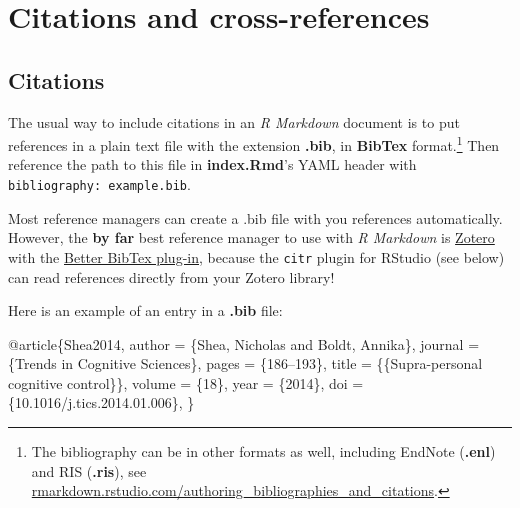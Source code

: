 \documentclass[a4paper, twoside]{templates/ociamthesis}
\newenvironment{Shaded}{\begin{snugshade}}{\end{snugshade}}
\newcommand{\DataTypeTok}[1]{\textcolor[rgb]{0.13,0.29,0.53}{#1}}
\newcommand{\NormalTok}[1]{#1}
\newcommand{\OtherTok}[1]{\textcolor[rgb]{0.56,0.35,0.01}{#1}}
\newcommand{\VariableTok}[1]{\textcolor[rgb]{0.00,0.00,0.00}{#1}}
\renewenvironment{Shaded}
{
  \vspace{4pt}%
  \begin{snugshade}%
}{%
  \end{snugshade}%
  \vspace{4pt}%
}
\begin{document}
\hypertarget{cites-and-refs}{%
\chapter{Citations and cross-references}\label{cites-and-refs}}


\minitoc 

\hypertarget{citations}{%
\section{Citations}\label{citations}}

The usual way to include citations in an \emph{R Markdown} document is to put references in a plain text file with the extension \textbf{.bib}, in \textbf{BibTex} format.\footnote{The bibliography can be in other formats as well, including EndNote (\textbf{.enl}) and RIS (\textbf{.ris}), see \href{https://rmarkdown.rstudio.com/authoring_bibliographies_and_citations.html}{rmarkdown.rstudio.com/authoring\_bibliographies\_and\_citations}.}
Then reference the path to this file in \textbf{index.Rmd}'s YAML header with \texttt{bibliography:\ example.bib}.

Most reference managers can create a .bib file with you references automatically.
However, the \textbf{by far} best reference manager to use with \emph{R Markdown} is \href{https://www.zotero.org}{Zotero} with the \href{https://retorque.re/zotero-better-bibtex/}{Better BibTex plug-in}, because the \texttt{citr} plugin for RStudio (see below) can read references directly from your Zotero library!

Here is an example of an entry in a \textbf{.bib} file:

\begin{Shaded}
\begin{Highlighting}[]
\VariableTok{@article}\NormalTok{\{}\OtherTok{Shea2014}\NormalTok{,}
  \DataTypeTok{author}\NormalTok{ =        \{Shea, Nicholas and Boldt, Annika\},}
  \DataTypeTok{journal}\NormalTok{ =       \{Trends in Cognitive Sciences\},}
  \DataTypeTok{pages}\NormalTok{ =         \{186--193\},}
  \DataTypeTok{title}\NormalTok{ =         \{\{Supra-personal cognitive control\}\},}
  \DataTypeTok{volume}\NormalTok{ =        \{18\},}
  \DataTypeTok{year}\NormalTok{ =          \{2014\},}
  \DataTypeTok{doi}\NormalTok{ =           \{10.1016/j.tics.2014.01.006\},}
\NormalTok{\}}
\end{Highlighting}
\end{Shaded}
\end{document}
